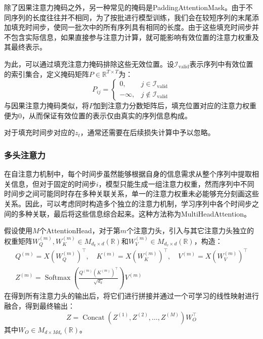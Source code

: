 \begin{note}
	除了因果注意力掩码之外，另一种常见的掩码是\gls{PaddingAttentionMask}。由于不同序列的长度往往并不相同，为了按批进行模型训练，我们会在较短序列的末尾添加填充时间步，使同一批次中的所有序列具有相同的长度。由于这些填充时间步并不包含实际信息，如果直接参与注意力计算，就可能影响有效位置的注意力权重及其最终表示。\par
	为此，可以通过填充注意力掩码排除这些无效位置。设$\mathcal{I}_{\mathrm{valid}}$表示序列中有效位置的索引集合，定义掩码矩阵$P\in\mathbb{R}^{T\times T}$为：
	\begin{equation*}
		P_{ij}=
		\begin{cases}
			0,&j\in\mathcal{I}_{\mathrm{valid}}\\
			-\infty,&j\notin\mathcal{I}_{\mathrm{valid}}
		\end{cases}
	\end{equation*}
	与因果注意力掩码类似，将$P$加到注意力分数矩阵后，填充位置对应的注意力权重便为$0$，从而保证有效位置的表示仅由真实的序列信息构成。\par
	对于填充时间步对应的$z_t$，通常还需要在后续损失计算中予以忽略。
\end{note}
\subsubsection{多头注意力}
在自注意力机制中，每个时间步虽然能够根据自身的信息需求从整个序列中提取相关信息，但对于固定的时间步$i$，模型只能生成一组注意力权重，然而序列中不同时间步之间可能同时存在多种关联关系，单一的注意力权重未必能够充分刻画这些关系。因此，可以考虑同时构造多个独立的注意力机制，学习序列中各个时间步之间的多种关联，最后将这些信息综合起来。这种方法称为\gls{MultiHeadAttention}。\par
假设使用$M$个\gls{AttentionHead}，对于第$m$个注意力头，引入与其它注意力头独立的权重矩阵$W_Q^{(m)},W_K^{(m)}\in M_{d_k\times d}(\mathbb{R})$和$W_V^{(m)}\in M_{d_v\times d}(\mathbb{R})$，构造：
\begin{gather*}
	Q^{(m)}=X(W_Q^{(m)})^\top,\quad K^{(m)}=X(W_K^{(m)})^\top,\quad V^{(m)}=X(W_V^{(m)})^\top \\ Z^{(m)}=\operatorname{Softmax}\left(\frac{Q^{(m)}(K^{(m)})^\top}{\sqrt{d_k}}\right)V^{(m)}
\end{gather*}
在得到所有注意力头的输出后，将它们进行拼接并通过一个可学习的线性映射进行融合，得到最终输出：
\begin{equation*}
	Z=\operatorname{Concat}\left(Z^{(1)},Z^{(2)},\dots,Z^{(M)}\right)W_O^\top
\end{equation*}
其中$W_O\in M_{d\times Md_v}(\mathbb{R})$。

